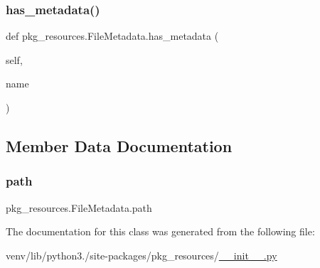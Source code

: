 \mbox{\label{classpkg__resources_1_1FileMetadata_a369b72f554a1c35205959814237cb06d}} 
\subsubsection{\texorpdfstring{has\+\_\+metadata()}{has\_metadata()}}
{\footnotesize\ttfamily def pkg\+\_\+resources.\+File\+Metadata.\+has\+\_\+metadata (\begin{DoxyParamCaption}\item[{}]{self,  }\item[{}]{name }\end{DoxyParamCaption})}



\subsection{Member Data Documentation}
\mbox{\label{classpkg__resources_1_1FileMetadata_a2855060a8b7e183c33be0b709c9288c7}} 
\subsubsection{\texorpdfstring{path}{path}}
{\footnotesize\ttfamily pkg\+\_\+resources.\+File\+Metadata.\+path}



The documentation for this class was generated from the following file\+:\begin{DoxyCompactItemize}
\item 
venv/lib/python3./site-\/packages/pkg\+\_\+resources/\hyperlink{venv_2lib_2python3_89_2site-packages_2pkg__resources_2____init_____8py}{\+\_\+\+\_\+init\+\_\+\+\_\+.\+py}\end{DoxyCompactItemize}
